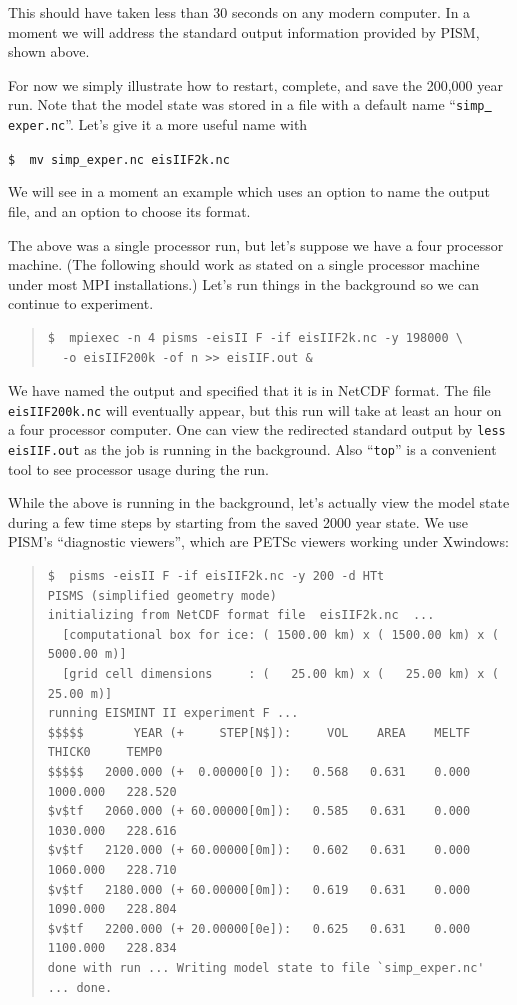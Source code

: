 \documentclass[12pt,final]{amsart}
\renewcommand{\t}[1]{\texttt{#1}}
\begin{document}
This should have taken less than 30 seconds on any modern computer.  In a moment we will address the standard output information provided by PISM, shown above.

For now we simply illustrate how to restart, complete, and save the 200,000 year run.  Note that the model state was stored in a file with a default name ``\texttt{simp\underline{ }exper.nc}''.  Let's give it a more useful name with

\verb|$  mv simp_exper.nc eisIIF2k.nc|

\noindent We will see in a moment an example which uses an option to name the output file, and an option to choose its format.

The above was a single processor run, but let's suppose we have a four processor machine.  (The following should work as stated on a single processor machine under most MPI installations.)  Let's run things in the background so we can continue to experiment.

\small\begin{quote}\begin{verbatim}
$  mpiexec -n 4 pisms -eisII F -if eisIIF2k.nc -y 198000 \
  -o eisIIF200k -of n >> eisIIF.out &
\end{verbatim}
\end{quote}\normalsize

\noindent We have named the output and specified that it is in NetCDF format.  The file \verb|eisIIF200k.nc| will eventually appear, but this run will take at least an hour on a four processor computer.  One can view the redirected standard output by \verb|less eisIIF.out| as the job is running in the background.  Also ``\t{top}'' is a convenient tool to see processor usage during the run.

While the above is running in the background, let's actually view the model state during a few time steps by starting from the saved 2000 year state.  We use PISM's ``diagnostic viewers'', which are PETSc viewers working under Xwindows:

\small\begin{quote}\begin{verbatim}
$  pisms -eisII F -if eisIIF2k.nc -y 200 -d HTt
PISMS (simplified geometry mode)
initializing from NetCDF format file  eisIIF2k.nc  ...
  [computational box for ice: ( 1500.00 km) x ( 1500.00 km) x ( 5000.00 m)]
  [grid cell dimensions     : (   25.00 km) x (   25.00 km) x (   25.00 m)]
running EISMINT II experiment F ...
$$$$$       YEAR (+     STEP[N$]):     VOL    AREA    MELTF     THICK0     TEMP0
$$$$$   2000.000 (+  0.00000[0 ]):   0.568   0.631    0.000   1000.000   228.520
$v$tf   2060.000 (+ 60.00000[0m]):   0.585   0.631    0.000   1030.000   228.616
$v$tf   2120.000 (+ 60.00000[0m]):   0.602   0.631    0.000   1060.000   228.710
$v$tf   2180.000 (+ 60.00000[0m]):   0.619   0.631    0.000   1090.000   228.804
$v$tf   2200.000 (+ 20.00000[0e]):   0.625   0.631    0.000   1100.000   228.834
done with run ... Writing model state to file `simp_exper.nc' ... done.
\end{verbatim}
\end{quote}\normalsize
\end{document}
